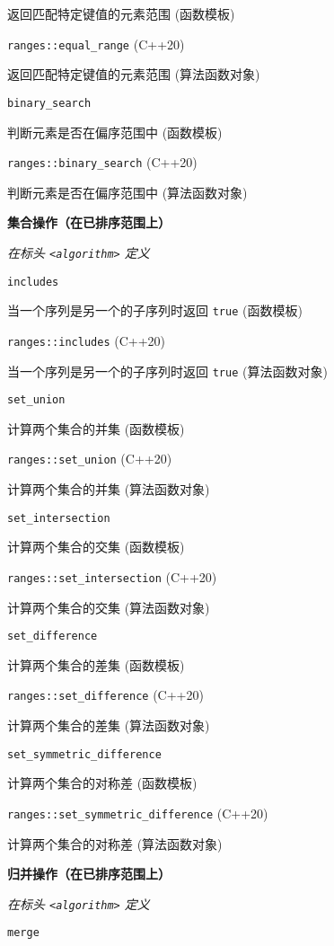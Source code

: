 返回匹配特定键值的元素范围 (函数模板)

\noindent \lstinline{ranges::equal_range} (C++20)

返回匹配特定键值的元素范围 (算法函数对象)

\noindent \lstinline{binary_search} 

判断元素是否在偏序范围中 (函数模板)

\noindent \lstinline{ranges::binary_search} (C++20)

判断元素是否在偏序范围中 (算法函数对象)


\noindent \textbf{集合操作（在已排序范围上）}

\textit{在标头 \lstinline{<algorithm>} 定义}


\noindent \lstinline{includes}

当⼀个序列是另⼀个的⼦序列时返回 \lstinline{true} (函数模板)

\noindent \lstinline{ranges::includes} (C++20) 

当⼀个序列是另⼀个的⼦序列时返回 \lstinline{true} (算法函数对象)

\noindent \lstinline{set_union} 

计算两个集合的并集 (函数模板)

\noindent \lstinline{ranges::set_union} (C++20) 

计算两个集合的并集 (算法函数对象)

\noindent \lstinline{set_intersection} 

计算两个集合的交集 (函数模板)

\noindent \lstinline{ranges::set_intersection} (C++20) 

计算两个集合的交集 (算法函数对象)

\noindent \lstinline{set_difference} 

计算两个集合的差集 (函数模板)

\noindent \lstinline{ranges::set_difference} (C++20) 

计算两个集合的差集 (算法函数对象)

\noindent \lstinline{set_symmetric_difference}

计算两个集合的对称差 (函数模板)

\noindent \lstinline{ranges::set_symmetric_difference} (C++20)

计算两个集合的对称差 (算法函数对象)

\noindent \textbf{归并操作（在已排序范围上）}

\textit{在标头 \lstinline{<algorithm>} 定义}

\noindent \lstinline{merge}

